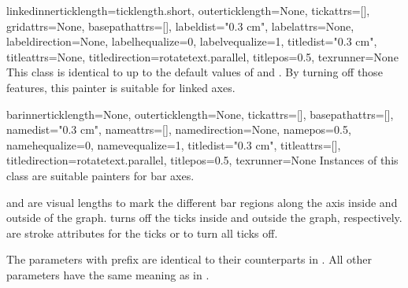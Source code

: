 \begin{classdesc}{linked}{innerticklength=ticklength.short,
                          outerticklength=None,
                          tickattrs=[],
                          gridattrs=None,
                          basepathattrs=[],
                          labeldist="0.3 cm",
                          labelattrs=None,
                          labeldirection=None,
                          labelhequalize=0,
                          labelvequalize=1,
                          titledist="0.3 cm",
                          titleattrs=None,
                          titledirection=rotatetext.parallel,
                          titlepos=0.5,
                          texrunner=None}
  This class is identical to  up to the default values of
   and . By turning off those
  features, this painter is suitable for linked axes.
\end{classdesc}

\begin{classdesc}{bar}{innerticklength=None,
                       outerticklength=None,
                       tickattrs=[],
                       basepathattrs=[],
                       namedist="0.3 cm",
                       nameattrs=[],
                       namedirection=None,
                       namepos=0.5,
                       namehequalize=0,
                       namevequalize=1,
                       titledist="0.3 cm",
                       titleattrs=[],
                       titledirection=rotatetext.parallel,
                       titlepos=0.5,
                       texrunner=None}
  Instances of this class are suitable painters for bar axes.

   and  are visual \PyX{}
  lengths to mark the different bar regions along the axis inside and
  outside of the graph.  turns off the ticks inside and
  outside the graph, respectively.  are stroke
  attributes for the ticks or  to turn all ticks off.

  The parameters with prefix  are identical to their
   counterparts in . All other parameters have
  the same meaning as in .
\end{classdesc}


